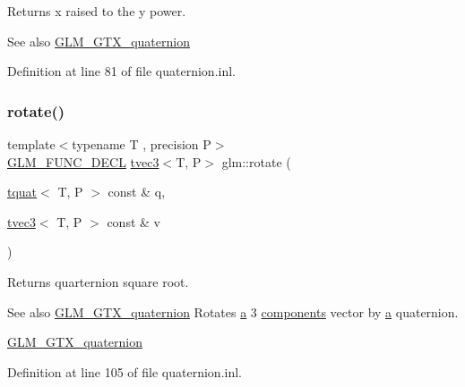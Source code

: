 Returns x raised to the y power.

\begin{DoxySeeAlso}{See also}
\mbox{\hyperlink{group__gtx__quaternion}{G\+L\+M\+\_\+\+G\+T\+X\+\_\+quaternion}} 
\end{DoxySeeAlso}


Definition at line 81 of file quaternion.\+inl.

\mbox{\label{group__gtx__quaternion_ga9f39f0d3ecd66839a4af44560aa10fb2}} 
\subsubsection{\texorpdfstring{rotate()}{rotate()}\hspace{0.1cm}{\footnotesize\ttfamily [1/2]}}
{\footnotesize\ttfamily template$<$typename T , precision P$>$ \\
\mbox{\hyperlink{setup_8hpp_ab2d052de21a70539923e9bcbf6e83a51}{G\+L\+M\+\_\+\+F\+U\+N\+C\+\_\+\+D\+E\+CL}} \mbox{\hyperlink{structglm_1_1tvec3}{tvec3}}$<$T, P$>$ glm\+::rotate (\begin{DoxyParamCaption}\item[{\mbox{\hyperlink{structglm_1_1tquat}{tquat}}$<$ T, P $>$ const \&}]{q,  }\item[{\mbox{\hyperlink{structglm_1_1tvec3}{tvec3}}$<$ T, P $>$ const \&}]{v }\end{DoxyParamCaption})}

Returns quarternion square root.

\begin{DoxySeeAlso}{See also}
\mbox{\hyperlink{group__gtx__quaternion}{G\+L\+M\+\_\+\+G\+T\+X\+\_\+quaternion}} Rotates \mbox{\hyperlink{glad_8h_ac8729153468b5dcf13f971b21d84d4e5}{a}} 3 \mbox{\hyperlink{group__gtx__range_gab866f7e9055dafab616eb0fb3ec8d08e}{components}} vector by \mbox{\hyperlink{glad_8h_ac8729153468b5dcf13f971b21d84d4e5}{a}} quaternion.

\mbox{\hyperlink{group__gtx__quaternion}{G\+L\+M\+\_\+\+G\+T\+X\+\_\+quaternion}} 
\end{DoxySeeAlso}


Definition at line 105 of file quaternion.\+inl.

\mbox{\label{group__gtx__quaternion_ga96575f8868b3f2aa3e13cab9b94ccbd3}} 
